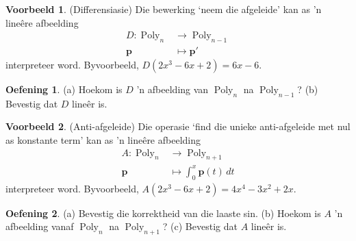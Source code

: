 \documentclass[a4paper,11pt]{book}
\theoremstyle{definition}
\newtheorem{exercise}{Oefening}
\newtheorem{example_environment}{Voorbeeld}[chapter]
\newcommand{\ve}[1]{\mathbf{#1}}
\newenvironment{example}
	{
		\begin{oframed}
		\begin{example_environment}
	}
	{
		\end{example_environment}
		\end{oframed}
	}
\DeclareMathOperator{\Poly}{Poly}
\begin{document}
\begin{example}(Differensiasie) \label{diff_of_poly}Die bewerking `neem die
	afgeleide' kan as 'n line{\^e}re afbeelding
	\begin{align*}
		D : \Poly_n & \rightarrow \Poly_{n-1} \\
		\ve{p} & \mapsto \ve{p}' \, 
	\end{align*}
	interpreteer word. Byvoorbeeld, $D(2x^3 - 6x + 2) = 6x - 6$.
	\begin{exercise} 
		(a) Hoekom is $D$ 'n afbeelding van $\Poly_n$ na $\Poly_{n-1}$? (b)
		Bevestig dat $D$ line{\^e}r is.
	\end{exercise}
\end{example}

\begin{example}(Anti-afgeleide) Die operasie `find die unieke
	anti-afgeleide met nul as konstante term' kan as 'n line{\^e}re
	afbeelding
	\begin{align*}
		A : \Poly_n & \rightarrow \Poly_{n+1} \\
		\ve{p} & \mapsto \int_0^x \ve{p}(t) \, dt 
	\end{align*}
	interpreteer word. Byvoorbeeld, $A(2x^3 - 6x + 2) = 4 x^4 - 3x^2 + 2x$.
	\begin{exercise} (a) Bevestig die korrektheid van die laaste sin. (b)
		Hoekom is $A$ 'n afbeelding vanaf $\Poly_n$ na $\Poly_{n+1}$? (c)
		Bevestig dat $A$ line{\^e}r is.
	\end{exercise} 
\end{example}
\end{document}
